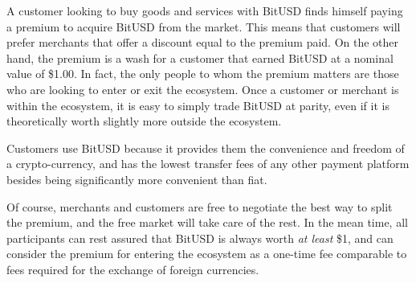 A customer looking to buy goods and services with BitUSD finds himself paying a
premium to acquire BitUSD from the market. This means that customers will
prefer merchants that offer a discount equal to the premium paid. On the other
hand, the premium is a wash for a customer that earned BitUSD at a nominal
value of \$1.00. In fact, the only people to whom the premium matters are those
who are looking to enter or exit the ecosystem. Once a customer or merchant is
within the ecosystem, it is easy to simply trade BitUSD at parity, even if it
is theoretically worth slightly more outside the ecosystem.

Customers use BitUSD because it provides them the convenience and freedom of a
crypto-currency, and has the lowest transfer fees of any other payment platform
besides being significantly more convenient than fiat.

Of course, merchants and customers are free to negotiate the best way to split
the premium, and the free market will take care of the rest. In the mean time,
all participants can rest assured that BitUSD is always worth \emph{at least}
\$1, and can consider the premium for entering the ecosystem as a one-time fee
comparable to fees required for the exchange of foreign currencies.
